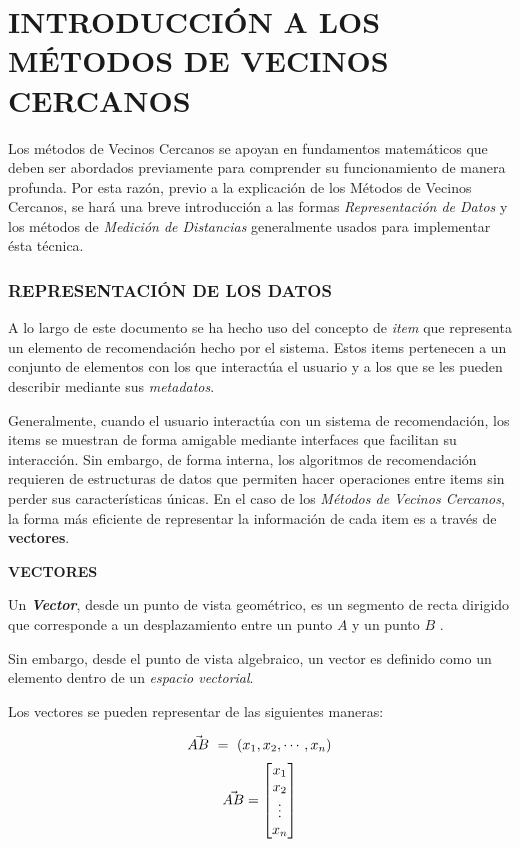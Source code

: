 \section{INTRODUCCIÓN A LOS MÉTODOS DE VECINOS CERCANOS}
    
    Los métodos de Vecinos Cercanos se apoyan en fundamentos matemáticos que deben ser abordados previamente para comprender su funcionamiento de manera profunda. Por esta razón, previo a la explicación de los Métodos de Vecinos Cercanos, se hará una breve introducción a las formas \textit{Representación de Datos} y los métodos de \textit{Medición de Distancias} generalmente usados para implementar ésta técnica.


    \subsubsection{REPRESENTACIÓN DE LOS DATOS}

    A lo largo de este documento se ha hecho uso del concepto de \textit{item} que representa un elemento de recomendación hecho por el sistema.
    Estos items pertenecen a un conjunto de elementos con los que interactúa el usuario y a los que se les pueden describir mediante sus \textit{metadatos}.

    Generalmente, cuando el usuario interactúa con un sistema de recomendación, los items se muestran de forma amigable mediante interfaces que facilitan su interacción. Sin embargo, de forma interna, los algoritmos de recomendación requieren de estructuras de datos que permiten hacer operaciones entre items sin perder sus características únicas. 
    En el caso de los \textit{Métodos de Vecinos Cercanos}, la forma más eficiente de representar la información de cada item es a través de \textbf{vectores}.

    \textbf{VECTORES}

    Un \textit{\textbf{Vector}}, desde un punto de vista geométrico, es un segmento de recta dirigido que corresponde a un desplazamiento entre un punto $A$ y un punto $B$ \parencite{poole2007álgebra}.
    
    Sin embargo, desde el punto de vista algebraico, un vector es definido como un elemento dentro de un \textit{espacio vectorial}.
    
    Los vectores se pueden representar de las siguientes maneras: 

    \begin{equation}
        \addequation{Definición de un Vector (Tupla)}
        \label{vectorTupla}
        \vec{AB} \ = \ (x_1, x_2, \cdots, x_n)
    \end{equation}
    \begin{equation}
        \vec{AB} = 
        \begin{bmatrix}
            x_1
            \\
            x_2
            \\
            \vdots
            \\
            x_n
        \end{bmatrix}
        \addequation{Definición de un Vector (Matriz)}
        \label{vectorMatriz}
    \end{equation}

